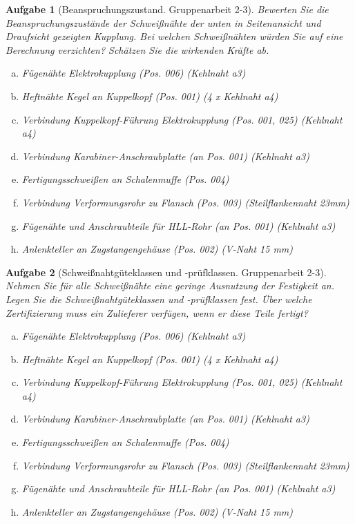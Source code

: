 \documentclass[11pt,a4paper,headsepline]{scrartcl}
\newtheorem{aufgabe}{Aufgabe}
\begin{document}
\begin{aufgabe}[Beanspruchungszustand. Gruppenarbeit 2-3] 
Bewerten Sie die Beanspruchungszust\"ande der Schwei{\ss}n\"ahte der unten in Seitenansicht und Draufsicht gezeigten Kupplung. Bei welchen Schwei{\ss}n\"ahten w\"urden Sie auf eine Berechnung verzichten? Sch\"atzen Sie die wirkenden Kr\"afte ab.

\begin{enumerate}[a)]
\item F\"ugen\"ahte Elektrokupplung (Pos. 006) (Kehlnaht a3)
\item Heftn\"ahte Kegel an Kuppelkopf (Pos. 001) (4 x Kehlnaht a4)
\item Verbindung Kuppelkopf-F\"uhrung Elektrokupplung (Pos. 001, 025) (Kehlnaht a4)
\item Verbindung Karabiner-Anschraubplatte (an Pos. 001) (Kehlnaht a3)
\item Fertigungsschwei{\ss}en an Schalenmuffe (Pos. 004)
\item Verbindung Verformungsrohr zu Flansch (Pos. 003) (Steilflankennaht 23mm)
\item F\"ugen\"ahte und Anschraubteile f\"ur HLL-Rohr (an Pos. 001) (Kehlnaht a3)
\item Anlenkteller an Zugstangengeh\"ause (Pos. 002) (V-Naht 15 mm)
\end{enumerate}

\end{aufgabe}
\vspace{0.5cm}
\begin{aufgabe}[Schwei{\ss}nahtg\"uteklassen und -pr\"ufklassen. Gruppenarbeit 2-3] 
Nehmen Sie f\"ur alle Schwei{\ss}n\"ahte eine geringe Ausnutzung der Festigkeit an. Legen Sie die Schwei{\ss}nahtg\"uteklassen und -pr\"ufklassen fest. \"Uber welche Zertifizierung muss ein Zulieferer verf\"ugen, wenn er diese Teile fertigt?

\begin{enumerate}[a)]
\item F\"ugen\"ahte Elektrokupplung (Pos. 006) (Kehlnaht a3)
\item Heftn\"ahte Kegel an Kuppelkopf (Pos. 001) (4 x Kehlnaht a4)
\item Verbindung Kuppelkopf-F\"uhrung Elektrokupplung (Pos. 001, 025) (Kehlnaht a4)
\item Verbindung Karabiner-Anschraubplatte (an Pos. 001) (Kehlnaht a3)
\item Fertigungsschwei{\ss}en an Schalenmuffe (Pos. 004)
\item Verbindung Verformungsrohr zu Flansch (Pos. 003) (Steilflankennaht 23mm)
\item F\"ugen\"ahte und Anschraubteile f\"ur HLL-Rohr (an Pos. 001) (Kehlnaht a3)
\item Anlenkteller an Zugstangengeh\"ause (Pos. 002) (V-Naht 15 mm)
\end{enumerate}

\end{aufgabe}
\end{document}
